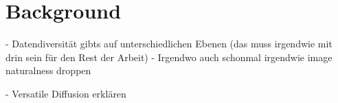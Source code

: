 \chapter{Background}


- Datendiversität gibts auf unterschiedlichen Ebenen (das muss irgendwie mit drin sein für den Rest der Arbeit)
- Irgendwo auch schonmal irgendwie image naturalness droppen



- Versatile Diffusion \cite{xuVersatileDiffusionText2024} erklären
